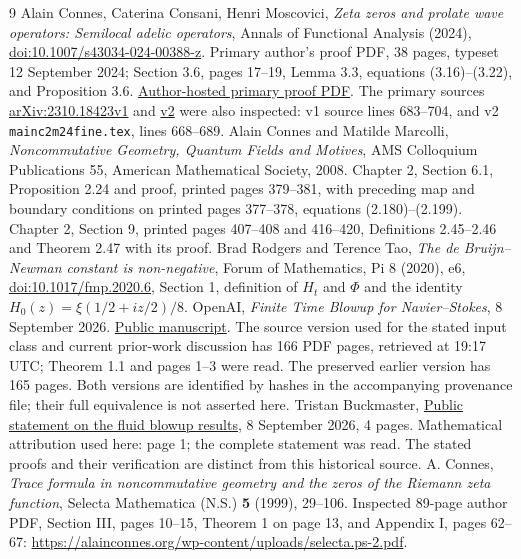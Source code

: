 \documentclass[11pt,a4paper]{article}
\theoremstyle{definition}
\theoremstyle{plain}
\begin{document}
\begin{thebibliography}{9}
 Alain Connes, Caterina Consani, Henri Moscovici,
\emph{Zeta zeros and prolate wave operators: Semilocal adelic operators},
Annals of Functional Analysis (2024),
\href{https://doi.org/10.1007/s43034-024-00388-z}{doi:10.1007/s43034-024-00388-z}.
Primary author's proof PDF, 38 pages, typeset 12 September 2024;
Section 3.6, pages 17--19, Lemma 3.3, equations (3.16)--(3.22),
and Proposition 3.6.
\href{https://alainconnes.org/wp-content/uploads/Zeta-zeros-and-prolateproofs-final-2024.pdf}{Author-hosted primary proof PDF}.
The primary sources
\href{https://arxiv.org/abs/2310.18423v1}{arXiv:2310.18423v1}
and \href{https://arxiv.org/abs/2310.18423v2}{v2} were also inspected:
v1 source lines 683--704, and v2
\texttt{mainc2m24fine.tex}, lines 668--689.
 Alain Connes and Matilde Marcolli,
\emph{Noncommutative Geometry, Quantum Fields and Motives},
AMS Colloquium Publications 55, American Mathematical Society, 2008.
Chapter 2, Section 6.1, Proposition 2.24 and proof,
printed pages 379--381, with preceding map and boundary conditions
on printed pages 377--378, equations (2.180)--(2.199).
Chapter 2, Section 9, printed pages 407--408 and 416--420,
Definitions 2.45--2.46 and Theorem 2.47 with its proof.
 Brad Rodgers and Terence Tao,
\emph{The de Bruijn--Newman constant is non-negative},
Forum of Mathematics, Pi 8 (2020), e6,
\href{https://doi.org/10.1017/fmp.2020.6}{doi:10.1017/fmp.2020.6},
Section 1, definition of $H_t$ and $\Phi$ and the identity
$H_0(z)=\xi(1/2+iz/2)/8$.
 OpenAI,
\emph{Finite Time Blowup for Navier--Stokes}, 8 September 2026.
\href{https://cdn.openai.com/pdf/32d9f210-8b73-45e0-91bc-82a30aef8a9a/navier-stokes.pdf}{Public manuscript}.
The source version used for the stated input class and current
prior-work discussion has 166 PDF pages, retrieved at 19:17 UTC;
Theorem 1.1 and pages 1--3 were read. The preserved earlier version has
165 pages. Both versions are identified by hashes in the accompanying
provenance file; their full equivalence is not asserted here.
 Tristan Buckmaster,
\href{https://cims.nyu.edu/~tristanb/statement.pdf}{Public statement
on the fluid blowup results}, 8 September 2026, 4 pages.
Mathematical attribution used here: page 1; the complete statement was
read. The stated proofs and their verification are distinct from this
historical source.
A. Connes,
\emph{Trace formula in noncommutative geometry and the zeros of the Riemann
zeta function},
Selecta Mathematica (N.S.) \textbf{5} (1999), 29--106.
Inspected 89-page author PDF, Section III, pages 10--15,
Theorem 1 on page 13, and Appendix I, pages 62--67:
\url{https://alainconnes.org/wp-content/uploads/selecta.ps-2.pdf}.


\end{thebibliography}
\end{document}
